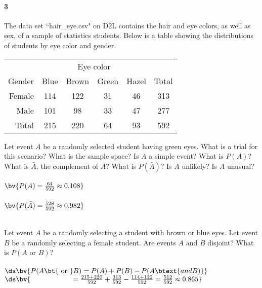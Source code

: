 \documentclass{article}
\begin{document}
\begin{flushleft}
\paragraph{3} The data set ``hair\_eye.csv" on D2L contains the hair and eye colors, as well as sex, of a sample of statistics students. Below is a table showing the distributions of students by eye color and gender.\\
\medskip
\renewcommand{\arraystretch}{1}
{\centering
\begin{tabular}{ r| c c c c | c}
& \multicolumn{4}{c}{Eye color}\\
Gender & Blue & Brown & Green & Hazel & Total\\
\hline
 Female &  114   &  122  &  31  &  46 & 313\\
 Male   & 101  &  98  &  33  &  47 & 277\\
 \hline
 Total	& 215 & 220 & 64 & 93 & 592 
\end{tabular}
\par}
\begin{enumalpha}
\item Let event $A$ be a randomly selected student having green eyes. What is a trial for this scenario? What is the sample space? Is $A$ a simple event? What is $P(A)$? What is $\bar A$, the complement of $A$? What is $P(\bar A)$? Is $A$ unlikely? Is $A$ unusual?\\
\medskip
{}
\medskip
{}\\
$\bv{ P(A) = \frac {64}{592} \approx 0.108}$\\
\\
$\bv{ P(\bar A) = \frac{528}{592}  \approx 0.982}$\\
\\
\vspace{.5in}

\item Let event $A$ be a randomly selecting a student with brown or blue eyes. Let event $B$ be a randomly selecting a female student. Are events $A$ and $B$ disjoint? What is $P(A \text{ or } B)$?\\
\medskip
{}\\
\medskip $\ds \bv{P(A \text{\bt{ or }} B) = P(A) + P(B) - P(A \btext{ and B)} }$\\
\medskip $\ds \bv{\qquad \qquad \qquad =  \frac {215 + 220}{592} + \frac {313}{592} - \frac {114+122}{592} = \frac {512}{592} \approx 0.865}$
\vspace{.5in}


\end{enumalpha}
\end{flushleft}
\end{document}
